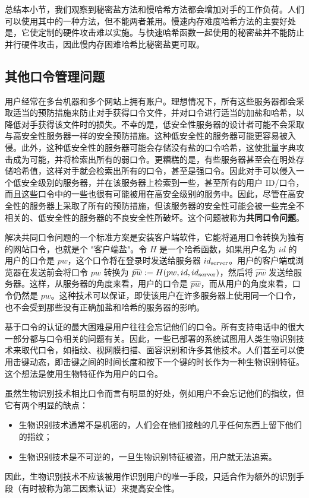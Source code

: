\begin{snote}[慢哈希与秘密盐.]
总结本小节，我们观察到秘密盐方法和慢哈希方法都会增加对手的工作负荷。人们可以使用其中的一种方法，但不能两者兼用。慢速内存难度哈希方法的主要好处是，它使定制的硬件攻击难以实施。与快速哈希函数一起使用的秘密盐并不能防止并行硬件攻击，因此慢内存困难哈希比秘密盐更可取。
\end{snote}

\subsection{其他口令管理问题}

\begin{snote}
用户经常在多台机器和多个网站上拥有账户。理想情况下，所有这些服务器都会采取适当的预防措施来防止对手获得口令文件，并对口令进行适当的加盐和哈希，以降低对手获得该文件时的损失。不幸的是，低安全性服务器的设计者可能不会采取与高安全性服务器一样的安全预防措施。这种低安全性的服务器可能更容易被入侵。此外，这种低安全性的服务器可能会存储没有盐的口令哈希，这使批量字典攻击成为可能，并将检索出所有的弱口令。更糟糕的是，有些服务器甚至会在明处存储哈希值，这样对手就会检索出所有的口令，甚至是强口令。因此对手可以侵入一个低安全级别的服务器，并在该服务器上检索到一些，甚至所有的用户 ID/口令，而且这些口令中的一些也很有可能被用在高安全级别的服务中。因此，尽管在高安全性的服务器上采取了所有的预防措施，但该服务器的安全性可能会被一些完全不相关的、低安全性的服务器的不良安全性所破坏。这个问题被称为\textbf{共同口令问题}。

解决共同口令问题的一个标准方案是安装客户端软件，它能将通用口令转换为独有的网站口令，也就是个 "客户端盐"。令 $H$ 是一个哈希函数，如果用户名为 $id$ 的用户的口令是 $pw$，这个口令将在登录时发送给服务器 $id_{\rm server}$。用户的客户端或浏览器在发送前会将口令 $pw$ 转换为 $\widehat{pw}:=H(pw,id,id_{\rm server})$，然后将 $\widehat{pw}$ 发送给服务器。这样，从服务器的角度来看，用户的口令是 $\widehat{pw}$，而从用户的角度来看，口令仍然是 $pw$。这种技术可以保证，即使该用户在许多服务器上使用同一个口令，也不会受到那些没有正确加盐和哈希的服务器的影响。
\end{snote}

\begin{snote}
基于口令的认证的最大困难是用户往往会忘记他们的口令。所有支持电话中的很大一部分都与口令相关的问题有关。因此，一些已部署的系统试图用人类生物识别技术来取代口令，如指纹、视网膜扫描、面容识别和许多其他技术。人们甚至可以使用击键动态，即击键之间的时间长度和按下一个键的时长作为一种生物识别特征。这个想法是使用生物特征作为用户的口令。

虽然生物识别技术相比口令而言有明显的好处，例如用户不会忘记他们的指纹，但它有两个明显的缺点：
\begin{itemize}
	\item 生物识别技术通常不是机密的，人们会在他们接触的几乎任何东西上留下他们的指纹；
	\item 生物识别技术是不可逆的，一旦生物识别特征被盗，用户就无法追索。
\end{itemize}
因此，生物识别技术不应该被用作识别用户的唯一手段，只适合作为额外的识别手段（有时被称为第二因素认证）来提高安全性。
\end{snote}